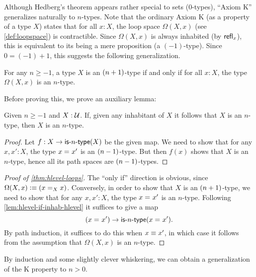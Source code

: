%

%
Although Hedberg's theorem appears rather special to sets ($0$-types), ``Axiom K'' generalizes naturally to $n$-types.
Note that the ordinary Axiom K (as a property of a type $X$) states that for all $x:X$, the loop space $\Omega(X,x)$ (see \cref{def:loopspace}) is contractible.
Since $\Omega(X,x)$ is always inhabited (by $\refl{x}$), this is equivalent to its being a mere proposition (a $(-1)$-type).
Since $0 = (-1)+1$, this suggests the following generalization.

\begin{thm}\label{thm:hlevel-loops}
  For any $n\geq -1$, a type $X$ is an $\nplusone$-type if and only if for all $x : X$, the type $\Omega(X, x)$ is an $n$-type.
\end{thm}

Before proving this, we prove an auxiliary lemma:

\begin{lem}\label{lem:hlevel-if-inhab-hlevel}
  Given $n \geq -1$ and $X : \type$.
  If, given any inhabitant of $X$ it follows that $X$ is an $n$-type, then $X$ is an $n$-type.
\end{lem}
\begin{proof}
  Let $f : X \to \istype{n}(X)$ be the given map.
  We need to show that for any $x, x' : X$, the type $\id{x}{x'}$ is an $\nminusone$-type.
  But then $f(x)$ shows that $X$ is an $n$-type, hence all its path spaces are $\nminusone$-types.
\end{proof}

\begin{proof}[Proof of \autoref{thm:hlevel-loops}]
  The ``only if'' direction is obvious, since $\Omega(X,x)\defeq (\id[X]xx)$.
  Conversely, in order to show that $X$ is an $\nplusone$-type, we need to show that for any $x, x' : X$, the type $\id{x}{x'}$ is an
$n$-type.
  Following \autoref{lem:hlevel-if-inhab-hlevel} it suffices to give a map
  \[ (\id{x}{x'}) \to \istype{n}(\id{x}{x'})  .\]
  By path induction, it suffices to do this when $x\jdeq x'$, in which case it follows from the assumption that $\Omega(X, x)$ is an
$n$-type.
\end{proof}

By induction and some slightly clever whiskering, we can obtain a generalization of the K property to $n>0$.

